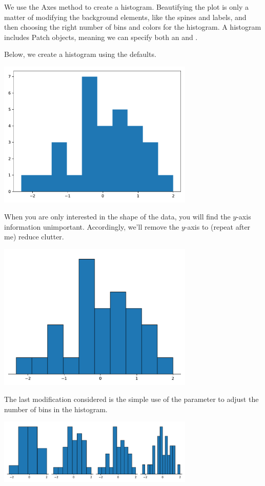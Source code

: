 We use the  Axes method to create a histogram. Beautifying the plot is only a matter of modifying the background elements, like the spines and labels, and then choosing the right number of bins and colors for the histogram. A histogram includes Patch objects, meaning we can specify both an  and . 

Below, we create a histogram using the defaults. 


\begin{center}
    \includegraphics[width = 0.7\textwidth]{figures/specialplots/default-hist.pdf}
\end{center}

When you are only interested in the shape of the data, you will find the $y$-axis information unimportant. Accordingly, we'll remove the $y$-axis to (repeat after me) reduce clutter. 


\begin{center}
    \includegraphics[width = 0.7\textwidth]{figures/specialplots/clean-hist.pdf}
\end{center}

The last modification considered is the simple use of the  parameter to adjust the number of bins in the histogram. 


\begin{center}
    \includegraphics[width = 0.7\textwidth]{figures/specialplots/bins-hist.pdf}
\end{center}
